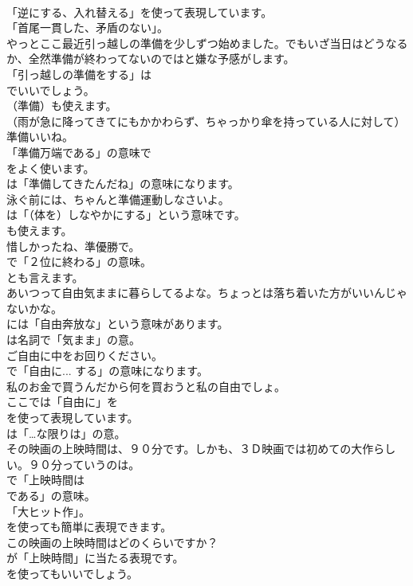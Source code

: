 \documentclass[8pt]{extreport}
\begin{document}
\begin{CJK}{UTF8}{min}
\\	「逆にする、入れ替える」を使って表現しています。
\\	「首尾一貫した、矛盾のない」。	
\\	やっとここ最近引っ越しの準備を少しずつ始めました。でもいざ当日はどうなるか、全然準備が終わってないのではと嫌な予感がします。 
\\	「引っ越しの準備をする」は 
\\	でいいでしょう。
\\	（準備）も使えます。	
\\	（雨が急に降ってきてにもかかわらず、ちゃっかり傘を持っている人に対して）準備いいね。 
\\	「準備万端である」の意味で
\\	をよく使います。
\\	は「準備してきたんだね」の意味になります。	
\\	泳ぐ前には、ちゃんと準備運動しなさいよ。 
\\	は「（体を）しなやかにする」という意味です。
\\	も使えます。	
\\	惜しかったね、準優勝で。 
\\	で「２位に終わる」の意味。
\\	とも言えます。	
\\	あいつって自由気ままに暮らしてるよな。ちょっとは落ち着いた方がいいんじゃないかな。 
\\	には「自由奔放な」という意味があります。
\\	は名詞で「気まま」の意。	
\\	ご自由に中をお回りください。 
\\	で「自由に... する」の意味になります。	
\\	私のお金で買うんだから何を買おうと私の自由でしょ。 
\\	ここでは「自由に」を 
\\	を使って表現しています。
\\	は「…な限りは」の意。	
\\	その映画の上映時間は、９０分です。しかも、３Ｄ映画では初めての大作らしい。９０分っていうのは。 
\\	で「上映時間は 
\\	である」の意味。
\\	「大ヒット作」。
\\	を使っても簡単に表現できます。	
\\	この映画の上映時間はどのくらいですか？ 
\\	が「上映時間」に当たる表現です。
\\	を使ってもいいでしょう。	

\end{CJK}
\end{document}
